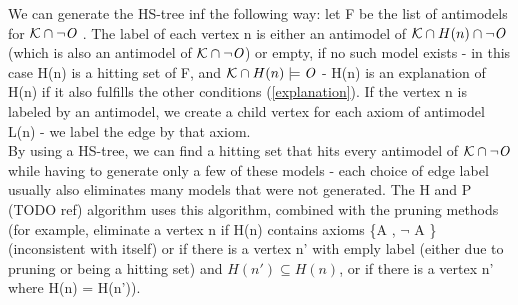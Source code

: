 We can generate the HS-tree inf the following way: let F be the list of antimodels for $\mathcal{K} \cap \neg \mathit{O}$ . The label of each vertex n is either an antimodel of $\mathcal{K} \cap H(n) \cap \neg \mathit{O}$ (which is also an antimodel of $\mathcal{K} \cap \neg \mathit{O}$) or empty, if no such model exists - in this case H(n) is a hitting set of F, and $\mathcal{K} \cap H(n) \models \mathit{O}$ - H(n) is an explanation of H(n) if it also fulfills the other conditions (\ref{explanation}). If the vertex n is labeled by an antimodel, we create a child vertex for each axiom of antimodel L(n) - we label the edge by that axiom. \\
By using a HS-tree, we can find a hitting set that hits every antimodel of $\mathcal{K} \cap \neg \mathit{O}$ while having to generate only a few of these models - each choice of edge label usually also eliminates many models that were not generated. 
The H and P (TODO ref) algorithm uses this algorithm, combined with the pruning methods (for example, eliminate a vertex n if H(n) contains axioms \{A , $\neg$ A \} (inconsistent with itself) or if there is a vertex n' with emply label (either due to pruning or being a hitting set) and $H(n') \subseteq H(n)$, or if there is a vertex n' where H(n) = H(n')).   


